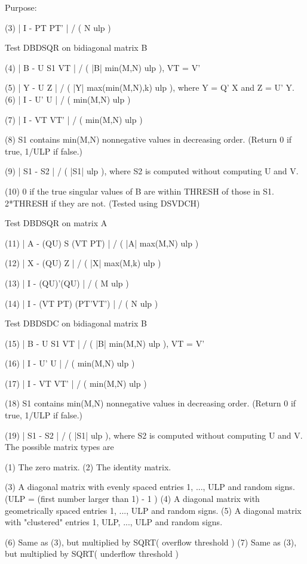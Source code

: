 \begin{DoxyParagraph}{Purpose\+: }
\begin{DoxyVerb}
 (3)   | I - PT PT' | / ( N ulp )

 Test DBDSQR on bidiagonal matrix B

 (4)   | B - U S1 VT | / ( |B| min(M,N) ulp ), VT = V'

 (5)   | Y - U Z | / ( |Y| max(min(M,N),k) ulp ), where Y = Q' X
                                                  and   Z = U' Y.
 (6)   | I - U' U | / ( min(M,N) ulp )

 (7)   | I - VT VT' | / ( min(M,N) ulp )

 (8)   S1 contains min(M,N) nonnegative values in decreasing order.
       (Return 0 if true, 1/ULP if false.)

 (9)   | S1 - S2 | / ( |S1| ulp ), where S2 is computed without
                                   computing U and V.

 (10)  0 if the true singular values of B are within THRESH of
       those in S1.  2*THRESH if they are not.  (Tested using
       DSVDCH)

 Test DBDSQR on matrix A

 (11)  | A - (QU) S (VT PT) | / ( |A| max(M,N) ulp )

 (12)  | X - (QU) Z | / ( |X| max(M,k) ulp )

 (13)  | I - (QU)'(QU) | / ( M ulp )

 (14)  | I - (VT PT) (PT'VT') | / ( N ulp )

 Test DBDSDC on bidiagonal matrix B

 (15)  | B - U S1 VT | / ( |B| min(M,N) ulp ), VT = V'

 (16)  | I - U' U | / ( min(M,N) ulp )

 (17)  | I - VT VT' | / ( min(M,N) ulp )

 (18)  S1 contains min(M,N) nonnegative values in decreasing order.
       (Return 0 if true, 1/ULP if false.)

 (19)  | S1 - S2 | / ( |S1| ulp ), where S2 is computed without
                                   computing U and V.
 The possible matrix types are

 (1)  The zero matrix.
 (2)  The identity matrix.

 (3)  A diagonal matrix with evenly spaced entries
      1, ..., ULP  and random signs.
      (ULP = (first number larger than 1) - 1 )
 (4)  A diagonal matrix with geometrically spaced entries
      1, ..., ULP  and random signs.
 (5)  A diagonal matrix with "clustered" entries 1, ULP, ..., ULP
      and random signs.

 (6)  Same as (3), but multiplied by SQRT( overflow threshold )
 (7)  Same as (3), but multiplied by SQRT( underflow threshold )


\end{DoxyVerb}
\end{DoxyParagraph}
